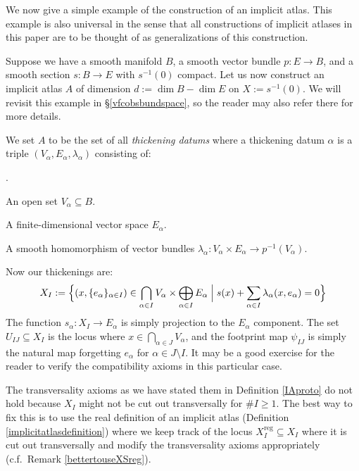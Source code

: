 \documentclass[12pt]{article}
\theoremstyle{definition}
\theoremstyle{remark}
\numberwithin{equation}{subsection}
\newcommand{\reg}{\mathrm{reg}}
\newcounter{rcounti}
\newenvironment{rlist}{\begin{list}{\roman{rcounti}.}{\usecounter{rcounti}
\setlength\itemsep{0pt}
\setlength\labelsep{4pt}
\setlength\labelwidth{16pt}
\setlength\leftmargin{32pt}
\setlength\listparindent{0pt}
\setlength\parsep{0pt}
\setlength\parskip{0pt}
\setlength\partopsep{0pt}
\setlength\rightmargin{0pt}
\setlength\topsep{0pt}
\setlength\itemindent{0pt}
}}{\end{list}}
\begin{document}
We now give a simple example of the construction of an implicit atlas.  This example is also universal in the sense that all constructions of implicit atlases in this paper are to be thought of as generalizations of this construction.

Suppose we have a smooth manifold $B$, a smooth vector bundle $p:E\to B$, and a smooth section $s:B\to E$ with $s^{-1}(0)$ compact.  Let us now construct an implicit atlas $A$ of dimension $d:=\dim B-\dim E$ on $X:=s^{-1}(0)$.  We will revisit this example in \S\ref{vfcobsbundspace}, so the reader may also refer there for more details.

We set $A$ to be the set of all \emph{thickening datums} where a thickening datum $\alpha$ is a triple $(V_\alpha,E_\alpha,\lambda_\alpha)$ consisting of:
\begin{rlist}
\item An open set $V_\alpha\subseteq B$.
\item A finite-dimensional vector space $E_\alpha$.
\item A smooth homomorphism of vector bundles $\lambda_\alpha:V_\alpha\times E_\alpha\to p^{-1}(V_\alpha)$.
\end{rlist}
Now our thickenings are:
\begin{equation}\label{fredholmsectionchart}
X_I:=\Bigl\{(x,\{e_\alpha\}_{\alpha\in I})\in\bigcap_{\alpha\in I}V_\alpha\times\bigoplus_{\alpha\in I}E_\alpha\Bigm|s(x)+\sum_{\alpha\in I}\lambda_\alpha(x,e_\alpha)=0\Bigr\}
\end{equation}
The function $s_\alpha:X_I\to E_\alpha$ is simply projection to the $E_\alpha$ component.  The set $U_{IJ}\subseteq X_I$ is the locus where $x\in\bigcap_{\alpha\in J}V_\alpha$, and the footprint map $\psi_{IJ}$ is simply the natural map forgetting $e_\alpha$ for $\alpha\in J\setminus I$.  It may be a good exercise for the reader to verify the compatibility axioms in this particular case.

The transversality axioms as we have stated them in Definition \ref{IAproto} do not hold because $X_I$ might not be cut out transversally for $\#I\geq 1$.  The best way to fix this is to use the real definition of an implicit atlas (Definition \ref{implicitatlasdefinition}) where we keep track of the locus $X_I^\reg\subseteq X_I$ where it is cut out transversally and modify the transversality axioms appropriately (c.f.\ Remark \ref{bettertouseXSreg}).
\end{document}
